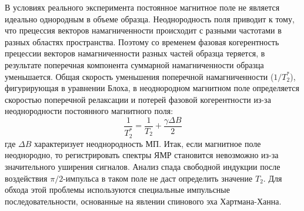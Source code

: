 В условиях реального эксперимента постоянное магнитное поле не является идеально однородным в объеме образца. 
Неоднородность поля приводит к тому, что прецессия векторов намагниченности происходит с разными частотами в разных областях пространства. 
Поэтому со временем фазовая когерентность прецессии векторов намагниченности разных частей образца теряется, в результате поперечная компонента суммарной намагниченности образца уменьшается. 
Общая скорость уменьшения поперечной намагниченности ($ 1/T_2^* $), фигурирующая в уравнении Блоха, в неоднородном магнитном поле определяется скоростью поперечной релаксации и потерей фазовой когерентности из-за неоднородности постоянного магнитного поля:
\begin{equation}
\label{T2*_def}
\dfrac{1}{T_2^*} = \dfrac{1}{T_2} + \dfrac{\gamma \Delta B}{2}
\end{equation}
где $ \Delta B $ характеризует неоднородность МП.
Итак, если магнитное поле неоднородно, то регистрировать спектры ЯМР становится невозможно из-за значительного уширения сигналов. Анализ спада свободной индукции после воздействия $ \pi /2 $-импульса в таком поле не даст определить значение $ T_2 $. Для обхода этой проблемы используются специальные импульсные последовательности, основанные на явлении спинового эха Хартмана-Ханна.